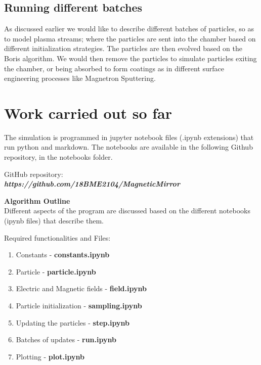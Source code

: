 \documentclass[12pt]{article}
\begin{document}
	\subsection{Running different batches}
	As discussed earlier we would like to describe different batches of particles, so as to model plasma streams; where the particles are sent into the chamber based on different initialization strategies. The particles are then evolved based on the Boris algorithm. We would then remove the particles to simulate particles exiting the chamber, or being absorbed to form coatings as in different surface engineering processes like Magnetron Sputtering.
	
	\section{Work carried out so far}
	The simulation is programmed in jupyter notebook files (.ipynb extensions) that run python and markdown. The notebooks are available in the following Github repository, in the notebooks folder.
	
	\begin{center}
		\begin{tcolorbox}[width=15cm]
			GitHub repository:
			\vspace{0.2cm} 
			\phantom{a} \\
			\phantom{push this repository}
			\textbf{\textit{https://github.com/18BME2104/MagneticMirror}} \\
			\phantom{a}
		\end{tcolorbox}
	\end{center}
	
	\textbf{Algorithm Outline} \\
	Different aspects of the program are discussed based on the different notebooks (ipynb files) that describe them.
	\begin{center}
		\begin{tcolorbox}[width=12cm]
			Required functionalities and Files:
			\vspace{0.2cm} 
			\begin{enumerate}
				\item Constants - \textbf{constants.ipynb}
				\item Particle - \textbf{particle.ipynb}
				\item Electric and Magnetic fields - \textbf{field.ipynb}
				\item Particle initialization - \textbf{sampling.ipynb}
				\item Updating the particles - \textbf{step.ipynb}
				\item Batches of updates - \textbf{run.ipynb}
				\item Plotting - \textbf{plot.ipynb}
			\end{enumerate}
		\end{tcolorbox}
	\end{center}
	
\end{document}
